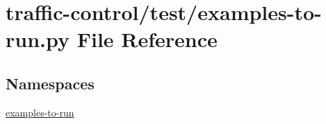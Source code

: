 \hypertarget{traffic-control_2test_2examples-to-run_8py}{}\section{traffic-\/control/test/examples-\/to-\/run.py File Reference}
\label{traffic-control_2test_2examples-to-run_8py}
\subsection*{Namespaces}
\begin{DoxyCompactItemize}
\item 
 \hyperlink{namespaceexamples-to-run}{examples-\/to-\/run}
\end{DoxyCompactItemize}

